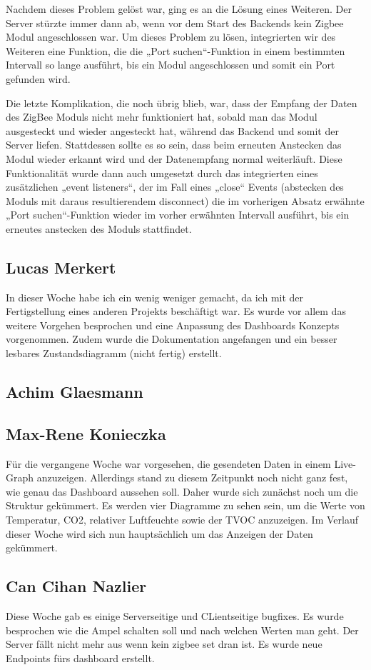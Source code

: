 \documentclass[]{article}
\begin{document}
Nachdem dieses Problem gelöst war, ging es an die Lösung eines Weiteren. Der Server stürzte immer dann ab, wenn vor dem Start des Backends kein Zigbee Modul angeschlossen war. Um dieses Problem zu lösen, integrierten wir des Weiteren eine Funktion, die die „Port suchen“-Funktion in einem bestimmten Intervall so lange ausführt, bis ein Modul angeschlossen und somit ein Port gefunden wird.

Die letzte Komplikation, die noch übrig blieb, war, dass der Empfang der Daten des ZigBee Moduls nicht mehr funktioniert hat, sobald man das Modul ausgesteckt und wieder angesteckt hat, während das Backend und somit der Server liefen. Stattdessen sollte es so sein, dass beim erneuten Anstecken das Modul wieder erkannt wird und der Datenempfang normal weiterläuft. Diese Funktionalität wurde dann auch umgesetzt durch das integrierten eines zusätzlichen „event listeners“, der im Fall eines „close“ Events (abstecken des Moduls mit daraus resultierendem disconnect) die im vorherigen Absatz erwähnte „Port suchen“-Funktion wieder im vorher erwähnten Intervall ausführt, bis ein erneutes anstecken des Moduls stattfindet.


\subsection{Lucas Merkert}
In dieser Woche habe ich ein wenig weniger gemacht, da ich mit der Fertigstellung eines anderen Projekts beschäftigt war. Es wurde vor allem das weitere Vorgehen besprochen und eine Anpassung des Dashboards Konzepts vorgenommen. Zudem wurde die Dokumentation angefangen und ein besser lesbares Zustandsdiagramm (nicht fertig) erstellt.

\subsection{Achim Glaesmann}


\subsection{Max-Rene Konieczka}
Für die vergangene Woche war vorgesehen, die gesendeten Daten in einem Live-Graph anzuzeigen. Allerdings stand zu diesem Zeitpunkt noch nicht ganz fest, wie genau das Dashboard aussehen soll. Daher wurde sich zunächst noch um die Struktur gekümmert. Es werden vier Diagramme zu sehen sein, um die Werte von Temperatur, CO2, relativer Luftfeuchte sowie der TVOC anzuzeigen. Im Verlauf dieser Woche wird sich nun hauptsächlich um das Anzeigen der Daten gekümmert. 

\subsection{Can Cihan Nazlier}
Diese Woche gab es einige Serverseitige und CLientseitige bugfixes. Es wurde besprochen wie die Ampel schalten soll und nach welchen Werten man geht. Der Server fällt nicht mehr aus wenn kein zigbee set dran ist. Es wurde neue Endpoints fürs dashboard erstellt.

\end{document}
